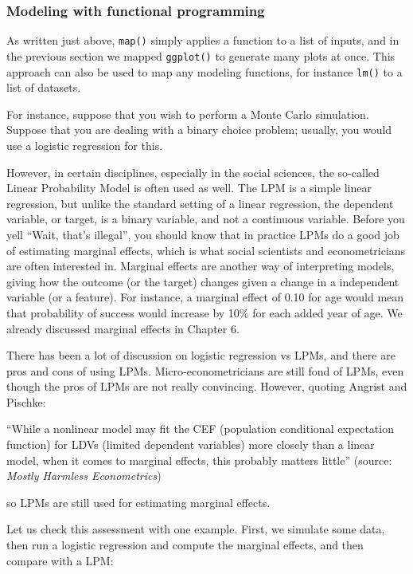\documentclass[
]{article}
\begin{document}
\hypertarget{modeling-with-functional-programming}{%
\subsubsection{Modeling with functional programming}\label{modeling-with-functional-programming}}

As written just above, \texttt{map()} simply applies a function to a list of inputs, and in the previous
section we mapped \texttt{ggplot()} to generate many plots at once. This approach can also be used to
map any modeling functions, for instance \texttt{lm()} to a list of datasets.

For instance, suppose that you wish to perform a Monte Carlo simulation. Suppose that you are
dealing with a binary choice problem; usually, you would use a logistic regression for this.

However, in certain disciplines, especially in the social sciences, the so-called Linear Probability
Model is often used as well. The LPM is a simple linear regression, but unlike the standard setting
of a linear regression, the dependent variable, or target, is a binary variable, and not a continuous
variable. Before you yell ``Wait, that's illegal'', you should know that in practice LPMs do a good
job of estimating marginal effects, which is what social scientists and econometricians are often
interested in. Marginal effects are another way of interpreting models, giving how the outcome
(or the target) changes given a change in a independent variable (or a feature). For instance,
a marginal effect of 0.10 for age would mean that probability of success would increase by 10\% for
each added year of age. We already discussed marginal effects in Chapter 6.

There has been a lot of discussion on logistic regression vs LPMs, and there are pros and cons
of using LPMs. Micro-econometricians are still fond of LPMs, even though the pros of LPMs are
not really convincing. However, quoting Angrist and Pischke:

``While a nonlinear model may fit the CEF (population conditional expectation function) for LDVs
(limited dependent variables) more closely than a linear model, when it comes to marginal effects,
this probably matters little'' (source: \emph{Mostly Harmless Econometrics})

so LPMs are still used for estimating marginal effects.

Let us check this assessment with one example. First, we simulate some data, then
run a logistic regression and compute the marginal effects, and then compare with a LPM:
\end{document}
